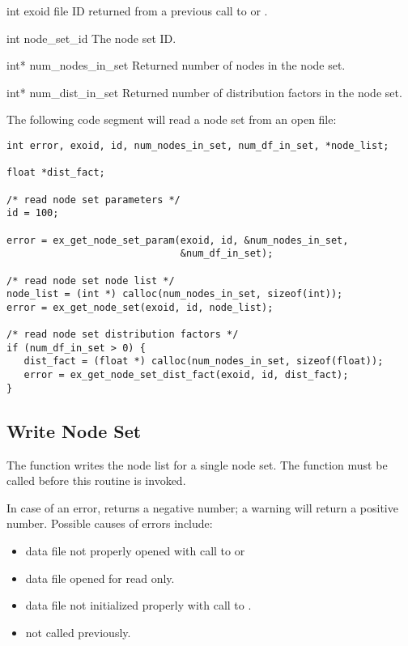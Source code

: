 \begin{parameters}
\item[{int exoid \R{}}]
\exo{} file ID returned from a previous call to  
or .

\item[{int node_set_id \R{}}]
The node set ID.

\item[{int* num_nodes_in_set \W{}}]
Returned number of nodes in the node set.

\item[{int* num_dist_in_set \W{}}]
Returned number of distribution factors in the node set.
\end{parameters}

The following code segment will read a node set from an open 
\exo{} file:
\begin{lstlisting}
int error, exoid, id, num_nodes_in_set, num_df_in_set, *node_list;

float *dist_fact;

/* read node set parameters */
id = 100;

error = ex_get_node_set_param(exoid, id, &num_nodes_in_set, 
                              &num_df_in_set);

/* read node set node list */
node_list = (int *) calloc(num_nodes_in_set, sizeof(int));
error = ex_get_node_set(exoid, id, node_list);

/* read node set distribution factors */
if (num_df_in_set > 0) {
   dist_fact = (float *) calloc(num_nodes_in_set, sizeof(float));
   error = ex_get_node_set_dist_fact(exoid, id, dist_fact); 
}
\end{lstlisting}

\subsection{Write Node Set}

The function  writes the node list for a
single node set. The function  must
be called before this routine is invoked.

In case of an error,  returns a negative 
number; a warning will return a positive number. 
Possible causes of errors include:

\begin{itemize}
 \item data file not properly opened with call to  
or 

 \item data file opened for read only.

 \item data file not initialized properly with call to .

 \item {} not called previously.
\end{itemize}

